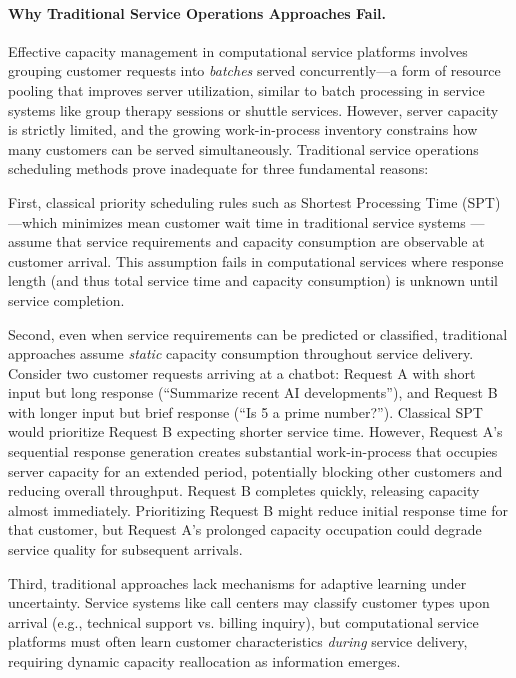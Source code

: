 \documentclass[poms,final,blindrev]{poms1_V1} %
\begin{document}
\paragraph{Why Traditional Service Operations Approaches Fail.}
Effective capacity management in computational service platforms involves grouping customer requests into \textit{batches} served concurrently—a form of resource pooling that improves server utilization, similar to batch processing in service systems like group therapy sessions or shuttle services. However, server capacity is strictly limited, and the growing work-in-process inventory constrains how many customers can be served simultaneously. Traditional service operations scheduling methods prove inadequate for three fundamental reasons:

First, classical priority scheduling rules such as Shortest Processing Time (SPT)—which minimizes mean customer wait time in traditional service systems \citep{conway1967theory}—assume that service requirements and capacity consumption are observable at customer arrival. This assumption fails in computational services where response length (and thus total service time and capacity consumption) is unknown until service completion.

Second, even when service requirements can be predicted or classified, traditional approaches assume \textit{static} capacity consumption throughout service delivery. Consider two customer requests arriving at a chatbot: Request A with short input but long response (``Summarize recent AI developments''), and Request B with longer input but brief response (``Is 5 a prime number?''). Classical SPT would prioritize Request B expecting shorter service time. However, Request A's sequential response generation creates substantial work-in-process that occupies server capacity for an extended period, potentially blocking other customers and reducing overall throughput. Request B completes quickly, releasing capacity almost immediately. Prioritizing Request B might reduce initial response time for that customer, but Request A's prolonged capacity occupation could degrade service quality for subsequent arrivals.

Third, traditional approaches lack mechanisms for adaptive learning under uncertainty. Service systems like call centers may classify customer types upon arrival (e.g., technical support vs. billing inquiry), but computational service platforms must often learn customer characteristics \textit{during} service delivery, requiring dynamic capacity reallocation as information emerges.
\end{document}
